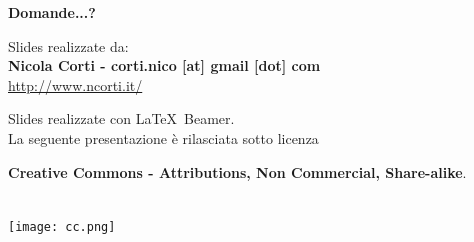 \documentclass[xcolor=svgnames,11pt]{beamer}
\begin{document}
\begin{frame}{}

\begin{center}
\begin{Huge}
{\color{android} \textbf{Domande...?}}
\end{Huge}

\vspace{1.5cm}
\begin{small}
Slides realizzate da:\\
\textbf{Nicola Corti - corti.nico [at] gmail [dot] com}\\
\url{http://www.ncorti.it/}

\bigskip

Slides realizzate con \LaTeX\ Beamer.\\
La seguente presentazione \`e rilasciata sotto licenza\\
\begin{footnotesize}	\textbf{Creative Commons - Attributions, Non Commercial, Share-alike}.
\end{footnotesize}
\\
\medskip
\texttt{[image: cc.png]}

\end{small}
\end{center}
\end{frame}
\end{document}
